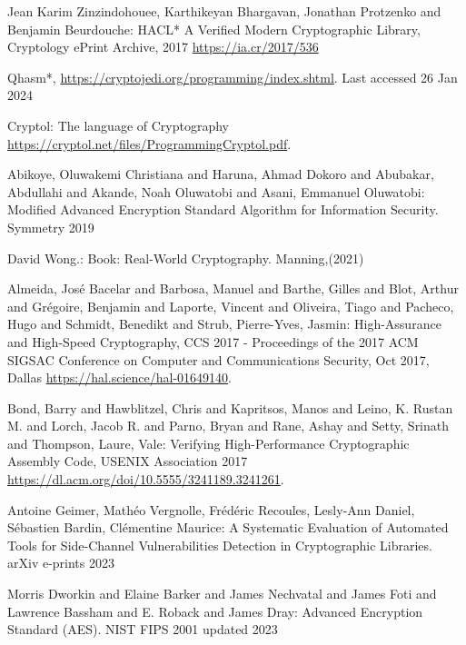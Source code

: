 \documentclass[runningheads]{llncs}
\begin{document}
%
%
% 
% 
%
\newpage
\begin{thebibliography}{8}

Jean Karim Zinzindohouee, Karthikeyan Bhargavan, Jonathan Protzenko and Benjamin Beurdouche: HACL* A Verified Modern Cryptographic Library, Cryptology ePrint Archive, 2017 \url{https://ia.cr/2017/536}

Qhasm*, \url{https://cryptojedi.org/programming/index.shtml}. Last accessed 26 Jan 2024

Cryptol: The language of Cryptography \url{https://cryptol.net/files/ProgrammingCryptol.pdf}.

Abikoye, Oluwakemi Christiana and Haruna, Ahmad Dokoro and Abubakar, Abdullahi and Akande, Noah Oluwatobi and Asani, Emmanuel Oluwatobi: Modified Advanced Encryption Standard Algorithm for Information Security. Symmetry 2019 

David Wong.: Book: Real-World Cryptography. Manning,(2021)

Almeida, Jos{\'e} Bacelar and Barbosa, Manuel and Barthe, Gilles and Blot, Arthur and Gr{\'e}goire, Benjamin and Laporte, Vincent and Oliveira, Tiago and Pacheco, Hugo and Schmidt, Benedikt and Strub, Pierre-Yves, Jasmin: High-Assurance and High-Speed Cryptography, CCS 2017 - Proceedings of the 2017 ACM SIGSAC Conference on Computer and Communications Security, Oct 2017, Dallas \url{https://hal.science/hal-01649140}.

Bond, Barry and Hawblitzel, Chris and Kapritsos, Manos and Leino, K. Rustan M. and Lorch, Jacob R. and Parno, Bryan and Rane, Ashay and Setty, Srinath and Thompson, Laure, Vale: Verifying High-Performance Cryptographic Assembly Code, USENIX Association 2017 \url{https://dl.acm.org/doi/10.5555/3241189.3241261}.

Antoine Geimer, Mathéo Vergnolle, Frédéric Recoules, Lesly-Ann Daniel, Sébastien Bardin, Clémentine Maurice: A Systematic Evaluation of Automated Tools for Side-Channel Vulnerabilities Detection in Cryptographic Libraries. arXiv e-prints 2023 

Morris Dworkin and Elaine Barker and James Nechvatal and James Foti and Lawrence Bassham and E. Roback and James Dray: Advanced Encryption Standard (AES). NIST FIPS 2001 updated 2023 


\end{thebibliography}
\end{document}
